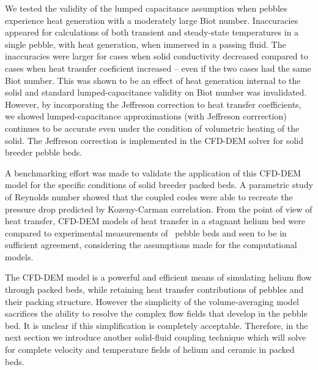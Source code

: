 We tested the validity of the lumped capacitance assumption when pebbles experience heat generation with a moderately large Biot number. Inaccuracies appeared for calculations of both transient and steady-state temperatures in a single pebble, with heat generation, when immersed in a passing fluid. The inaccuracies were larger for cases when solid conductivity decreased compared to cases when heat trasnfer coeficient increased -- even if the two cases had the same Biot number. This was shown to be an effect of heat generation internal to the solid and standard lumped-capacitance validity on Biot number was invalidated. However, by incorporating the Jeffreson correction to heat transfer coefficients, we showed lumped-capacitance approximations (with Jeffreson corrrection) continues to be accurate even under the condition of volumetric heating of the solid. The Jeffreson correction is implemented in the CFD-DEM solver for solid breeder pebble beds.

A benchmarking effort was made to validate the application of this CFD-DEM model for the specific conditions of solid breeder packed beds. A parametric study of Reynolds number showed that the coupled codes were able to recreate the pressure drop predicted by Kozeny-Carman correlation. From the point of view of heat transfer, CFD-DEM models of heat transfer in a stagnant helium bed were compared to experimental measurements of \lit~pebble beds and seen to be in sufficient agreement, considering the assumptions made for the computational models.

The CFD-DEM model is a powerful and efficient means of simulating helium flow through packed beds, while retaining heat transfer contributions of pebbles and their packing structure. However the simplicity of the volume-averaging model sacrifices the ability to resolve the complex flow fields that develop in the pebble bed. It is unclear if this simplification is completely acceptable. Therefore, in the next section we introduce another solid-fluid coupling technique which will solve for complete velocity and temperature fields of helium and ceramic in packed beds.